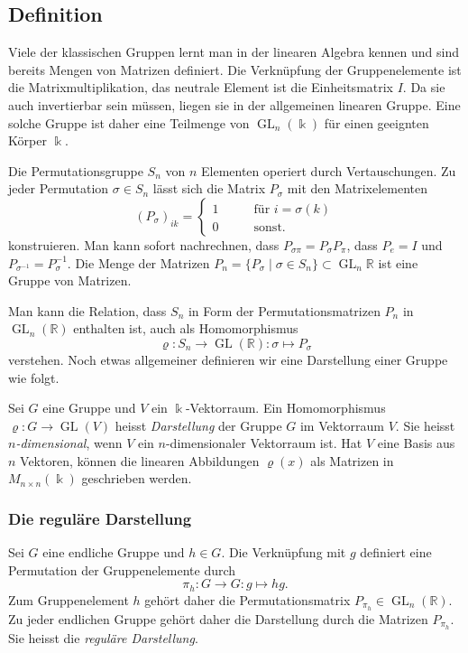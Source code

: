 %
%
%

%
%
\subsection{Definition}
Viele der klassischen Gruppen lernt man in der linearen Algebra
kennen und sind bereits Mengen von Matrizen definiert.
Die Verknüpfung der Gruppenelemente ist die Matrixmultiplikation,
das neutrale Element ist die Einheitsmatrix $I$.
Da sie auch invertierbar sein müssen, liegen sie in der 
allgemeinen linearen Gruppe.
Eine solche Gruppe ist daher eine Teilmenge von $\operatorname{GL}_n(\Bbbk)$
für einen geeignten Körper $\Bbbk$.

Die Permutationsgruppe $S_n$ von $n$ Elementen operiert durch 
Vertauschungen.
Zu jeder Permutation $\sigma\in S_n$ lässt sich die Matrix $P_\sigma$
mit den Matrixelementen
\[
(P_\sigma)_{ik}
=
\begin{cases}
1&\qquad\text{für $i=\sigma(k)$}\\
0&\qquad\text{sonst}.
\end{cases}
\]
konstruieren.
Man kann sofort nachrechnen, dass $P_{\sigma\pi} = P_\sigma P_\pi$,
dass $P_{e}=I$ und $P_{\sigma^{-1}}=P_\sigma^{-1}$.
Die Menge der Matrizen
$P_n=\{P_\sigma\mid\sigma\in S_n\}\subset\operatorname{GL}_n{\mathbb{R}}$
ist eine Gruppe von Matrizen.

Man kann die Relation, dass $S_n$ in Form der Permutationsmatrizen $P_n$
in $\operatorname{GL}_n(\mathbb{R})$ enthalten ist, auch als Homomorphismus
\[
\varrho
\colon 
S_n
\to
\operatorname{GL}(\mathbb{R})
:
\sigma
\mapsto
P_\sigma
\]
verstehen.
Noch etwas allgemeiner definieren wir eine Darstellung einer Gruppe
wie folgt.

\begin{definition}
Sei $G$ eine Gruppe und $V$ ein $\Bbbk$-Vektorraum.
Ein Homomorphismus $\varrho\colon G\to\operatorname{GL}(V)$
heisst {\em Darstellung} der Gruppe $G$ im Vektorraum $V$.
Sie heisst {\em $n$-dimensional}, wenn $V$ ein $n$-dimensionaler
Vektorraum ist.
Hat $V$ eine Basis aus $n$ Vektoren, können die linearen
Abbildungen $\varrho(x)$ als Matrizen in $M_{n\times n}(\Bbbk)$
geschrieben werden.
\end{definition}

\subsubsection{Die reguläre Darstellung}
Sei $G$ eine endliche Gruppe und $h\in G$.
Die Verknüpfung mit $g$ definiert eine Permutation der Gruppenelemente
durch
\[
\pi_h \colon G \to G : g \mapsto hg.
\]
Zum Gruppenelement $h$ gehört daher die Permutationsmatrix
$P_{\pi_h}\in\operatorname{GL}_n(\mathbb{R})$.
Zu jeder endlichen Gruppe gehört daher die Darstellung durch die
Matrizen $P_{\pi_h}$.
Sie heisst die {\em reguläre Darstellung}.

